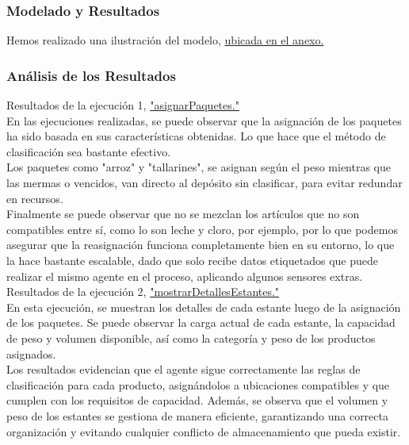 \documentclass[12pt]{article}
\begin{document}
\subsubsection{Modelado y Resultados}

Hemos realizado una ilustración del modelo, \hyperref[fig:modelo_1]{ubicada en el anexo.}

\subsubsection{Análisis de los Resultados}

Resultados de la ejecución 1, 
\hyperref[fig:asignarPaquetes]{"asignarPaquetes."}\\

En las ejecuciones realizadas, se puede observar que la asignación de los paquetes ha sido basada en sus características obtenidas. Lo que hace que el método de clasificación sea bastante efectivo.\\

Los paquetes como "arroz" y "tallarines", se asignan según el peso mientras que las mermas o vencidos, van directo al depósito sin clasificar, para evitar redundar en recursos.\\

Finalmente se puede observar que no se mezclan los artículos que no son compatibles entre sí, como lo son leche y cloro, por ejemplo, por lo que podemos asegurar que la reasignación funciona completamente bien en su entorno, lo que la hace bastante escalable, dado que solo recibe datos etiquetados que puede realizar el mismo agente en el proceso, aplicando algunos sensores extras.\\

Resultados de la ejecución 2, 
\hyperref[fig:detallesEstantes]{"mostrarDetallesEstantes." }\\

En esta ejecución, se muestran los detalles de cada estante luego de la asignación de los paquetes. Se puede observar la carga actual de cada estante, la capacidad de peso y volumen disponible, así como la categoría y peso de los productos asignados.\\

Los resultados evidencian que el agente sigue correctamente las reglas de clasificación para cada producto, asignándolos a ubicaciones compatibles y que cumplen con los requisitos de capacidad. Además, se observa que el volumen y peso de los estantes se gestiona de manera eficiente, garantizando una correcta organización y evitando cualquier conflicto de almacenamiento que pueda existir.
\end{document}
